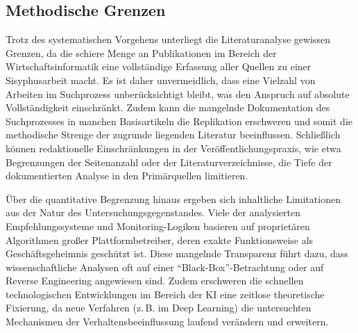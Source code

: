 \subsection{Methodische Grenzen}

Trotz des systematischen Vorgehens unterliegt die Literaturanalyse gewissen Grenzen, da die schiere Menge an Publikationen im Bereich der Wirtschaftsinformatik eine vollständige Erfassung aller Quellen zu einer Sisyphusarbeit macht. Es ist daher unvermeidlich, dass eine Vielzahl von Arbeiten im Suchprozess unberücksichtigt bleibt, was den Anspruch auf absolute Vollständigkeit einschränkt. Zudem kann die mangelnde Dokumentation des Suchprozesses in manchen Basisartikeln die Replikation erschweren und somit die methodische Strenge der zugrunde liegenden Literatur beeinflussen. Schließlich können redaktionelle Einschränkungen in der Veröffentlichungspraxis, wie etwa Begrenzungen der Seitenanzahl oder der Literaturverzeichnisse, die Tiefe der dokumentierten Analyse in den Primärquellen limitieren.

Über die quantitative Begrenzung hinaus ergeben sich inhaltliche Limitationen aus der Natur des Untersuchungsgegenstandes. Viele der analysierten Empfehlungssysteme und Monitoring-Logiken basieren auf proprietären Algorithmen großer Plattformbetreiber, deren exakte Funktionsweise als Geschäftsgeheimnis geschützt ist. Diese mangelnde Transparenz führt dazu, dass wissenschaftliche Analysen oft auf einer \enquote{Black-Box}-Betrachtung oder auf Reverse Engineering angewiesen sind. Zudem erschweren die schnellen technologischen Entwicklungen im Bereich der \ac{KI} eine zeitlose theoretische Fixierung, da neue Verfahren (z.\,B. im Deep Learning) die untersuchten Mechanismen der Verhaltensbeeinflussung laufend verändern und erweitern.
